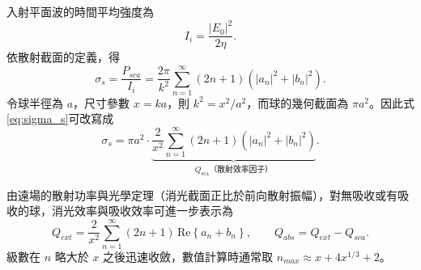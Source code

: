 入射平面波的時間平均強度為
\begin{equation}
    I_i=\frac{\left|E_0\right|^2}{2\eta}.
\end{equation}
依散射截面的定義，得
\begin{equation}
    \sigma_s=\frac{P_{sca}}{I_i}
    =\frac{2\pi}{k^2}
    \sum_{n=1}^{\infty}(2n+1)
    \left(|a_n|^2+|b_n|^2\right).
    \label{eq:sigma_s}
\end{equation}
令球半徑為 $a$，尺寸參數 $x=ka$，則 $k^2=x^2/a^2$，而球的幾何截面為
$\pi a^2$。因此式\eqref{eq:sigma_s}可改寫成
\begin{equation}
    \sigma_s
    =\pi a^2\cdot
    \underbrace{
    \frac{2}{x^2}
    \sum_{n=1}^{\infty}(2n+1)
    \left(|a_n|^2+|b_n|^2\right)
    }_{Q_{\text{sca}}\text{（散射效率因子）}}.
    \label{eq:Qsca_proof}
\end{equation}

由遠場的散射功率與光學定理（消光截面正比於前向散射振幅），對無吸收或有吸收的球，消光效率與吸收效率可進一步表示為
\begin{equation}
    Q_{ext} = \frac{2}{x^2} \sum_{n=1}^{\infty} (2n+1)\, \mathrm{Re}\left\{ a_n + b_n \right\},
    \qquad
    Q_{abs} = Q_{ext} - Q_{sca}.
\end{equation}
級數在 $n$ 略大於 $x$ 之後迅速收斂，數值計算時通常取 $n_{max} \approx x + 4x^{1/3} + 2$。
